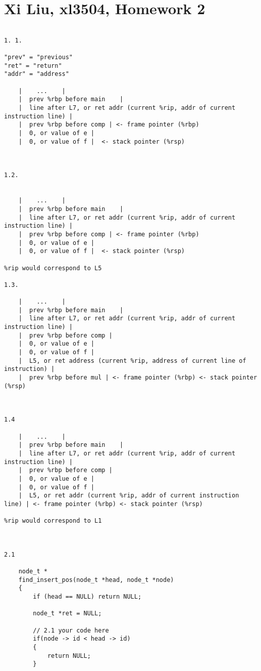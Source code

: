 \documentclass[12pt,border=4pt,multi]{article}%
\begin{document}
\section*{Xi Liu, xl3504, Homework 2}

\begin{verbatim}

1. 1.

"prev" = "previous"
"ret" = "return"
"addr" = "address"
 
	|    ...	|
	|  prev %rbp before main	| 
	|  line after L7, or ret addr (current %rip, addr of current instruction line) |
	|  prev %rbp before comp | <- frame pointer (%rbp)
	|  0, or value of e	|
	|  0, or value of f	|  <- stack pointer (%rsp)



1.2.

 
	|    ...	|
	|  prev %rbp before main	| 
	|  line after L7, or ret addr (current %rip, addr of current instruction line) |
	|  prev %rbp before comp | <- frame pointer (%rbp)
	|  0, or value of e	|
	|  0, or value of f	|  <- stack pointer (%rsp)

%rip would correspond to L5

1.3.

	|    ...	|
	|  prev %rbp before main	| 
	|  line after L7, or ret addr (current %rip, addr of current instruction line) |
	|  prev %rbp before comp | 
	|  0, or value of e	|
	|  0, or value of f	|  
	|  L5, or ret address (current %rip, address of current line of instruction) | 
	|  prev %rbp before mul | <- frame pointer (%rbp) <- stack pointer (%rsp)



1.4
	
	|    ...	|
	|  prev %rbp before main	| 
	|  line after L7, or ret addr (current %rip, addr of current instruction line) |
	|  prev %rbp before comp | 
	|  0, or value of e	|
	|  0, or value of f	|  
	|  L5, or ret addr (current %rip, addr of current instruction line) | <- frame pointer (%rbp) <- stack pointer (%rsp)

%rip would correspond to L1



2.1

    node_t *
    find_insert_pos(node_t *head, node_t *node)
    {
        if (head == NULL) return NULL;

        node_t *ret = NULL;

        // 2.1 your code here
        if(node -> id < head -> id)
        {
            return NULL;
        }


\end{verbatim}
\end{document}
